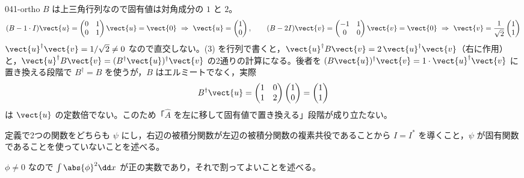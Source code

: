 \documentclass[uplatex,dvipdfmx,a4paper,11pt]{jsarticle}
\begin{document}
\begin{kaisetsu}{041-ortho}
 $B$ は上三角行列なので固有値は対角成分の $1$ と $2$。
\[
  (B-1\cdot I)\vect{u}=\begin{pmatrix}0&1\\0&1\end{pmatrix}\vect{u}=\vect{0}\ \Rightarrow\ \vect{u}=\begin{pmatrix}1\\0\end{pmatrix},\qquad
  (B-2I)\vect{v}=\begin{pmatrix}-1&1\\0&0\end{pmatrix}\vect{v}=\vect{0}\ \Rightarrow\ \vect{v}=\frac{1}{\sqrt{2}}\begin{pmatrix}1\\1\end{pmatrix}
\]
$\vect{u}^{\dagger}\vect{v}=1/\sqrt{2}\neq0$ なので直交しない。(3) を行列で書くと，$\vect{u}^{\dagger}B\vect{v}=2\,\vect{u}^{\dagger}\vect{v}$（右に作用）と，$\vect{u}^{\dagger}B\vect{v}=(B^{\dagger}\vect{u})^{\dagger}\vect{v}$ の2通りの計算になる。後者を $(B\vect{u})^{\dagger}\vect{v}=1\cdot\vect{u}^{\dagger}\vect{v}$ に置き換える段階で $B^{\dagger}=B$ を使うが，$B$ はエルミートでなく，実際
\[
  B^{\dagger}\vect{u}=\begin{pmatrix}1&0\\1&2\end{pmatrix}\begin{pmatrix}1\\0\end{pmatrix}=\begin{pmatrix}1\\1\end{pmatrix}
\]
は $\vect{u}$ の定数倍でない。このため「$\hat{A}$ を左に移して固有値で置き換える」段階が成り立たない。
\begin{ronten}
  \item {} 定義で2つの関数をどちらも $\psi$ にし，右辺の被積分関数が左辺の被積分関数の複素共役であることから $I=I^{*}$ を導くこと，$\psi$ が固有関数であることを使っていないことを述べる。
  \item {} $\phi\neq0$ なので $\int\abs{\phi}^{2}\dd x$ が正の実数であり，それで割ってよいことを述べる。

\end{ronten}
\end{kaisetsu}
\end{document}
